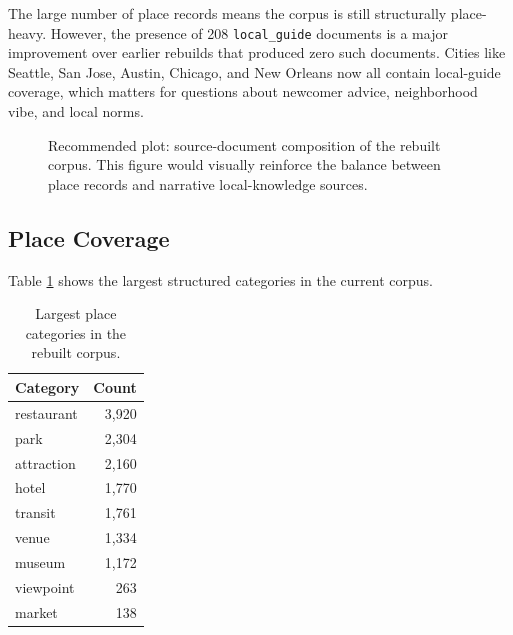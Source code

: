 \documentclass[11pt]{article}
\begin{document}
The large number of place records means the corpus is still structurally place-heavy. However, the presence of 208 \texttt{local\_guide} documents is a major improvement over earlier rebuilds that produced zero such documents. Cities like Seattle, San Jose, Austin, Chicago, and New Orleans now all contain local-guide coverage, which matters for questions about newcomer advice, neighborhood vibe, and local norms.

\begin{figure}[H]
\centering
{}
\caption{Recommended plot: source-document composition of the rebuilt corpus. This figure would visually reinforce the balance between place records and narrative local-knowledge sources.}
\label{fig:source-breakdown-plot}
\end{figure}

\subsection{Place Coverage}
Table \ref{tab:place-cats} shows the largest structured categories in the current corpus.

\begin{table}[H]
\centering
\caption{Largest place categories in the rebuilt corpus.}
\label{tab:place-cats}
\begin{tabular}{lr}
\toprule
Category & Count \\
\midrule
restaurant & 3,920 \\
park & 2,304 \\
attraction & 2,160 \\
hotel & 1,770 \\
transit & 1,761 \\
venue & 1,334 \\
museum & 1,172 \\
viewpoint & 263 \\
market & 138 \\
\bottomrule
\end{tabular}
\end{table}
\end{document}
